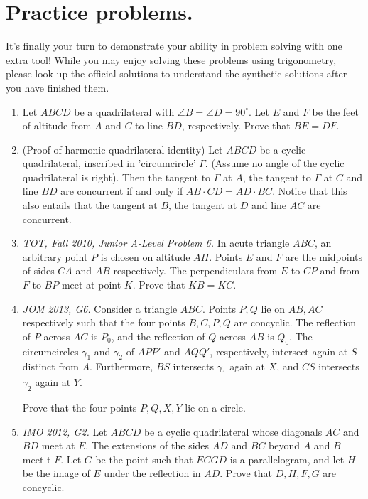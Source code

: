 \documentclass[11pt,a4paper]{article}
\begin{document}
\section {Practice problems.}

It's finally your turn to demonstrate your ability in problem solving with one extra tool! While you may enjoy solving these problems using trigonometry, please look up the official solutions to understand the synthetic solutions after you have finished them.

\begin{enumerate}
\item Let $ABCD$ be a quadrilateral with $\angle B=\angle D=90^{\circ}$. Let $E$ and $F$ be the feet of altitude from $A$ and $C$ to line $BD$, respectively. Prove that $BE=DF$.

\item (Proof of harmonic quadrilateral identity) Let $ABCD$ be a cyclic quadrilateral, inscribed in 'circumcircle' $\Gamma$. (Assume no angle of the cyclic quadrilateral is right). Then the tangent to $\Gamma$ at $A$, the tangent to $\Gamma$ at $C$ and line $BD$ are concurrent if and only if $AB\cdot CD=AD\cdot BC$. Notice that this also entails that the tangent at $B$, the tangent at $D$ and line $AC$ are concurrent.

\item\emph {TOT, Fall 2010, Junior A-Level Problem 6.} In acute triangle $ABC$, an arbitrary point $P$ is chosen on altitude $AH$. Points $E$ and $F$ are the midpoints of sides $CA$ and $AB$ respectively. The perpendiculars from $E$ to $CP$ and from $F$ to $BP$ meet at point $K$. Prove that $KB=KC$.

\item\emph {JOM 2013, G6.} Consider a triangle $ABC$. Points $P, Q$ lie on $AB, AC$ respectively such that the four points $B, C, P, Q$ are concyclic. The reflection of $P$ across $AC$ is $P_0$, and the reflection of $Q$ across $AB$ is $Q_0$.
The circumcircles $\gamma_1$ and $\gamma_2$ of $APP'$ and $AQQ'$, respectively, intersect again at $S$ distinct from $A$. Furthermore, $BS$ intersects $\gamma_1$ again at $X$, and $CS$ intersects $\gamma_2$ again at $Y$.

Prove that the four points $P, Q, X, Y$ lie on a circle.

\item\emph {IMO 2012, G2.} Let $ABCD$ be a cyclic quadrilateral whose diagonals $AC$ and $BD$ meet at $E$. The extensions of the sides $AD$ and $BC$ beyond $A$ and $B$ meet t $F$. Let $G$ be the point such that $ECGD$ is a parallelogram, and let $H$ be the image of $E$ under the reflection in $AD$. Prove that $D, H, F, G$ are concyclic.


\end{enumerate}
\end{document}
